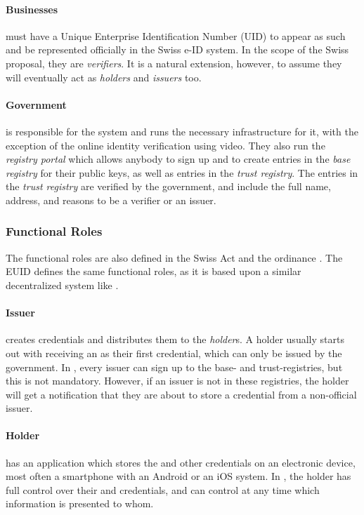 \paragraph{Businesses} must have a Unique Enterprise Identification Number (UID) to appear as such and be represented officially in the Swiss e-ID system.
In the scope of the Swiss proposal, they are \emph{verifiers}.
It is a natural extension, however, to assume they will eventually act as \emph{holders} and \emph{issuers} too.

\paragraph{Government} is responsible for the system and runs the necessary infrastructure for it, with the exception of the online identity verification using video.
They also run the \emph{registry portal} which allows anybody to sign up and to create entries in the \emph{base registry} for their public keys, as well as entries in the \emph{trust registry}.
The entries in the \emph{trust registry} are verified by the government, and include the full name, address, and reasons to be a verifier or an issuer.

\subsubsection{Functional Roles}

The functional roles are also defined in the Swiss \eid Act \cite{BGEID24} and the ordinance \cite{VEID25}.
The EUID \cite{EUDI-ARF} defines the same functional roles, as it is based upon a similar decentralized system like \swiyu.


\paragraph{Issuer} creates credentials and distributes them to the \emph{holder}s.
A holder usually starts out with receiving an \eid as their first credential, which can only be issued by the government.
In \swiyu, every issuer can sign up to the base- and trust-registries, but this is not mandatory.
However, if an issuer is not in these registries, the holder will get a notification that they are about to store a credential from a non-official issuer.

\paragraph{Holder} has an application which stores the \eid and other credentials on an electronic device, most often a smartphone with an Android or an iOS system.
In \swiyu, the holder has full control over their \eid and credentials, and can control at any time which information is presented to whom.

